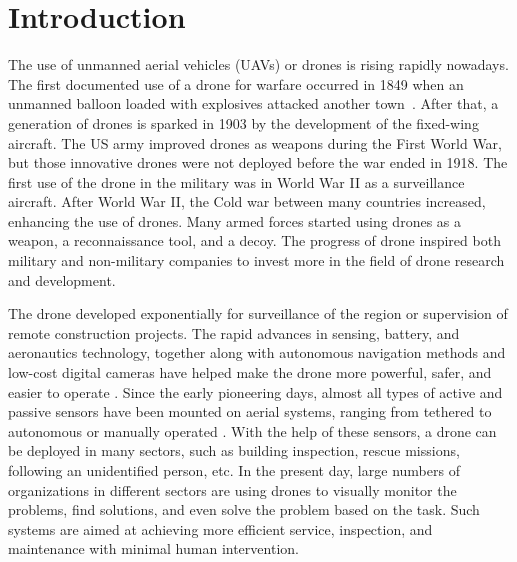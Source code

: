 \section{Introduction}
\label{introductionsection}
The use of unmanned aerial vehicles (UAVs) or drones is rising rapidly nowadays. The first documented use of a drone for warfare occurred in  1849 when an unmanned balloon loaded with explosives attacked another town~\cite{mckenna2016public}. After that, a generation of drones is sparked in 1903 by the development of the fixed-wing aircraft. The US army improved drones as weapons during the First World War, but those innovative drones were not deployed before the war ended in 1918. The first use of the drone in the military was in World War II as a surveillance aircraft. After World War II, the Cold war between many countries increased, enhancing the use of drones. Many armed forces started using drones as a weapon, a reconnaissance tool, and a decoy. The progress of drone inspired both military and non-military companies to invest more in the field of drone research and development.

The drone developed exponentially for surveillance of the region or supervision of remote construction projects. The rapid advances in sensing, battery, and aeronautics technology, together along with autonomous navigation methods and low-cost digital cameras have helped make the drone more powerful, safer, and easier to operate \cite{liu2014review}. Since the early pioneering days, almost all types of active and passive sensors have been mounted on aerial systems, ranging from tethered to autonomous or manually operated \cite{sensing2015disasters, dong2013comprehensive}. With the help of these sensors, a drone can be deployed in many sectors, such as building inspection, rescue missions, following an unidentified person, etc. In the present day, large numbers of organizations in different sectors are using drones to visually monitor the problems, find solutions, and even solve the problem based on the task. Such systems are aimed at achieving more efficient service, inspection, and maintenance with minimal human intervention.

